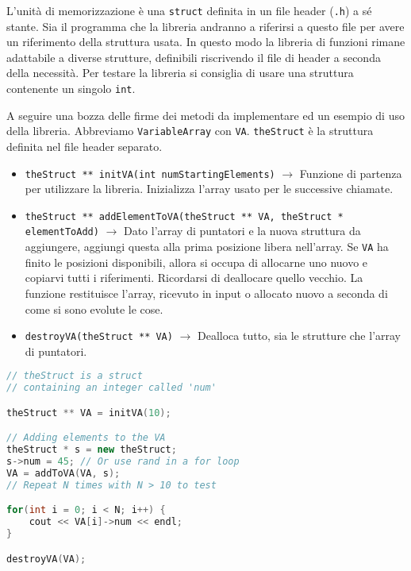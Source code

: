 \documentclass{article}
\begin{document}
L'unità di memorizzazione è una \texttt{struct} definita in un file header (\texttt{.h}) a sé stante. Sia il programma che la libreria andranno a riferirsi a questo file per avere un riferimento della struttura usata. In questo modo la libreria di funzioni rimane adattabile a diverse strutture, definibili riscrivendo il file di header a seconda della necessità. Per testare la libreria si consiglia di usare una struttura contenente un singolo \texttt{int}.

A seguire una bozza delle firme dei metodi da implementare ed un esempio di uso della libreria. Abbreviamo \texttt{VariableArray} con \texttt{VA}. \texttt{theStruct} è la struttura definita nel file header separato.
\begin{itemize}
	\item \texttt{theStruct ** initVA(int numStartingElements)} $\rightarrow$ Funzione di partenza per utilizzare la libreria. Inizializza l'array usato per le successive chiamate. 
	\item \texttt{theStruct ** addElementToVA(theStruct ** VA, theStruct * elementToAdd)} $\rightarrow$ Dato l'array di puntatori e la nuova struttura da aggiungere, aggiungi questa alla prima posizione libera nell'array.  Se \texttt{VA} ha finito le posizioni disponibili, allora si occupa di allocarne uno nuovo e copiarvi tutti i riferimenti. Ricordarsi di deallocare quello vecchio. La funzione restituisce l'array, ricevuto in input o allocato nuovo a seconda di come si sono evolute le cose. 
	\item \texttt{destroyVA(theStruct ** VA)} $\rightarrow$ Dealloca tutto, sia le strutture che l'array di puntatori.
\end{itemize}

\begin{file}
	\begin{lstlisting}[language=C++]
// theStruct is a struct 
// containing an integer called 'num'

theStruct ** VA = initVA(10);

// Adding elements to the VA
theStruct * s = new theStruct;
s->num = 45; // Or use rand in a for loop
VA = addToVA(VA, s);
// Repeat N times with N > 10 to test

for(int i = 0; i < N; i++) {
	cout << VA[i]->num << endl;
}	

destroyVA(VA);

	\end{lstlisting}
\end{file}
\end{document}
